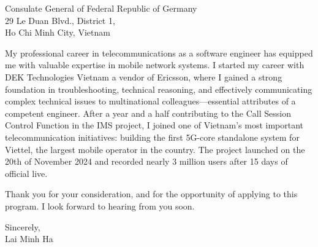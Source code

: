 \documentclass[a4paper,11pt]{letter}
\begin{document}
\begin{letter}{
    Consulate General of Federal Republic of Germany
    \\ 29 Le Duan Blvd., District 1,
    \\ Ho Chi Minh City, Vietnam
}


My professional career in telecommunications as a software engineer has equipped me with valuable expertise in mobile network systems. I started my career with DEK Technologies Vietnam a vendor of Ericsson, where I gained a strong foundation in troubleshooting, technical reasoning, and effectively communicating complex technical issues to multinational colleagues—essential attributes of a competent engineer. After a year and a half contributing to the Call Session Control Function in the IMS project, I joined one of Vietnam's most important telecommunication initiatives: building the first 5G-core standalone system for Viettel, the largest mobile operator in the country. The project launched on the 20th of November 2024 and recorded nearly 3 million users after 15 days of official live.

Thank you for your consideration, and for the opportunity of applying to this program. I look forward to hearing from you soon.

\begin{flushright}
    Sincerely,
    \\ Lai Minh Ha
\end{flushright}

\end{letter}
\end{document}
